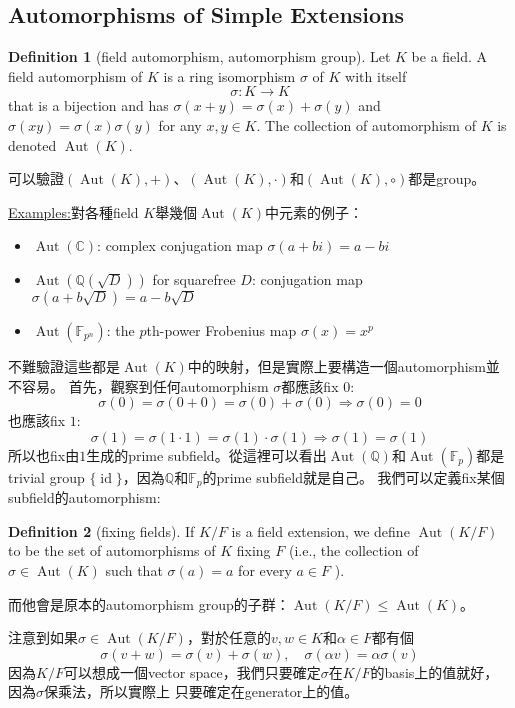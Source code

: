 \documentclass[12pt]{article}
\theoremstyle{definition}
\newcommand{\ex}{\noindent\underline{Examples:}}
\newtheorem{dfn}{Definition}
\newcommand{\CC}{\mathbb C}
\newcommand{\FF}{\mathbb F}
\newcommand{\QQ}{\mathbb Q}
\DeclareMathOperator{\Aut}{Aut}
\DeclareMathOperator{\id}{id}
\begin{document}
\subsection{Automorphisms of Simple Extensions}

\begin{dfn}[field automorphism, automorphism group]
	Let $K$ be a field. A field automorphism of $K$ is a ring isomorphism $\sigma$ of $K$ with itself
	\[\sigma:K\to K\]
	that is a bijection and has $\sigma(x+y)=\sigma(x)+\sigma(y)$ and $\sigma(xy)=\sigma(x)\sigma(y)$ for any $x,y\in K$.
	The collection of automorphism of $K$ is denoted $\Aut(K)$.
\end{dfn}
可以驗證$(\Aut(K),+)$、$(\Aut(K),\cdot)$和$(\Aut(K),\circ)$都是group。

\ex 對各種field $K$舉幾個$\Aut(K)$中元素的例子：

\begin{itemize}
	\item $\Aut(\CC)$: complex conjugation map $\sigma(a+bi)=a-bi$
	\item $\Aut(\QQ(\sqrt{D}))$ for squarefree $D$: conjugation map $\sigma(a+b\sqrt{D})=a-b\sqrt{D}$
	\item $\Aut(\FF_{p^n})$: the $p$th-power Frobenius map $\sigma(x)=x^p$
\end{itemize}

不難驗證這些都是$\Aut(K)$中的映射，但是實際上要構造一個automorphism並不容易。
首先，觀察到任何automorphism $\sigma$都應該fix $0$:
\[\sigma(0)=\sigma(0+0)=\sigma(0)+\sigma(0) \Rightarrow \sigma(0)=0\]
也應該fix $1$:
\[\sigma(1)=\sigma(1\cdot 1)=\sigma(1)\cdot\sigma(1) \Rightarrow \sigma(1)=\sigma(1)\]
所以也fix由$1$生成的prime subfield。從這裡可以看出$\Aut(\QQ)$和$\Aut(\FF_p)$都是
trivial group $\{\id\}$，因為$\QQ$和$\FF_p$的prime subfield就是自己。
我們可以定義fix某個subfield的automorphism:
\begin{dfn}[fixing fields]
	If $K/F$ is a field extension, we define $\Aut(K/F)$ to be the set of
	automorphisms of $K$ fixing $F$ (i.e., the collection of $\sigma\in \Aut(K)$
	such that $\sigma(a)=a$ for every $a\in F$ ).
\end{dfn}
而他會是原本的automorphism group的子群：$\Aut(K/F)\le \Aut(K)$。

注意到如果$\sigma\in\Aut(K/F)$，對於任意的$v,w\in K$和$\alpha\in F$都有個
\[\sigma(v+w)=\sigma(v)+\sigma(w),\quad \sigma(\alpha v)=\alpha\sigma(v)\]
因為$K/F$可以想成一個vector space，我們只要確定$\sigma$在$K/F$的basis上的值就好，因為$\sigma$保乘法，所以實際上
只要確定在generator上的值。
\end{document}
